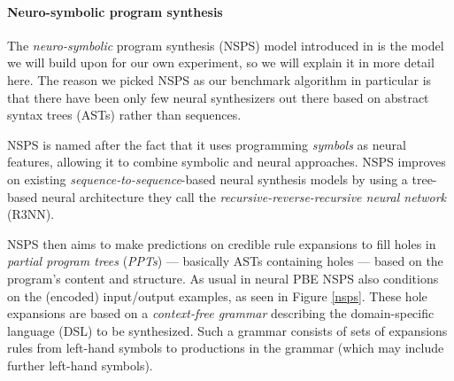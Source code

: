 \documentclass{article} %
\begin{document}
\paragraph{Neuro-symbolic program synthesis} \label{sec:nsps}

The \emph{neuro-symbolic} program synthesis (NSPS) model introduced in \citet{nsps}
is the model we will build upon for our own experiment, so we will explain it in more detail here.
The reason we picked NSPS as our benchmark algorithm in particular is
that there have been only few neural synthesizers out there
based on abstract syntax trees (ASTs) rather than sequences.

NSPS is named after the fact that it uses programming \emph{symbols} as neural features,
allowing it to combine symbolic and neural approaches.
NSPS improves on existing \emph{sequence-to-sequence}-based neural synthesis models
by using a tree-based neural architecture they call the
\emph{recursive-reverse-recursive neural network} (R3NN).

NSPS then aims to make predictions on credible rule expansions to fill holes
in \emph{partial program trees} (\emph{PPTs}) --- basically ASTs containing holes --- based on the program's content and structure.
As usual in neural PBE NSPS also conditions on the (encoded) input/output examples, as seen in Figure \ref{nsps}.
These hole expansions are based on a \emph{context-free grammar} describing the domain-specific language (DSL) to be synthesized.
Such a grammar consists of sets of expansions rules from left-hand symbols to productions in the grammar (which may include further left-hand symbols).
\end{document}
